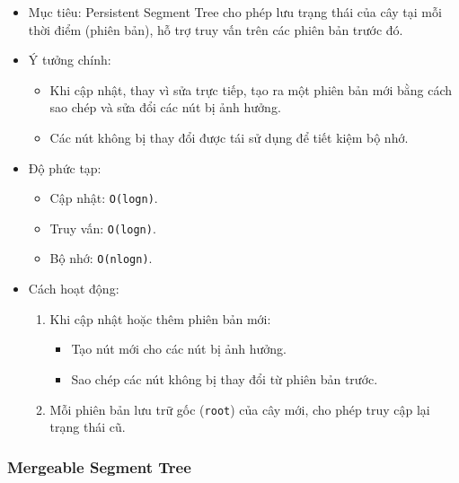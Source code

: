 \documentclass[a4paper]{article}
\begin{document}
\begin{itemize}[label = $\circ$]
    \item Mục tiêu: Persistent Segment Tree cho phép lưu trạng thái của cây tại mỗi thời điểm (phiên bản), hỗ trợ truy vấn trên các phiên bản trước đó.
    \item Ý tưởng chính: 
        \begin{itemize} [label = $\bullet$]
            \item Khi cập nhật, thay vì sửa trực tiếp, tạo ra một phiên bản mới bằng cách sao chép và sửa đổi các nút bị ảnh hưởng.
            \item Các nút không bị thay đổi được tái sử dụng để tiết kiệm bộ nhớ.
        \end{itemize}
    \item Độ phức tạp:
    \begin{itemize}[label = $\bullet$]
        \item Cập nhật: \texttt{O(logn)}.
        \item Truy vấn: \texttt{O(logn)}.
        \item Bộ nhớ: \texttt{O(nlogn)}.
    \end{itemize}
    \item Cách hoạt động: 
    \begin{enumerate}
        \item Khi cập nhật hoặc thêm phiên bản mới:
            \begin{itemize}[label = $\bullet$]
                \item Tạo nút mới cho các nút bị ảnh hưởng.
                \item Sao chép các nút không bị thay đổi từ phiên bản trước.
            \end{itemize}
        \item Mỗi phiên bản lưu trữ gốc (\texttt{root}) của cây mới, cho phép truy cập lại trạng thái cũ.
    \end{enumerate}    
\end{itemize}

\subsubsection{Mergeable Segment Tree}
\end{document}
